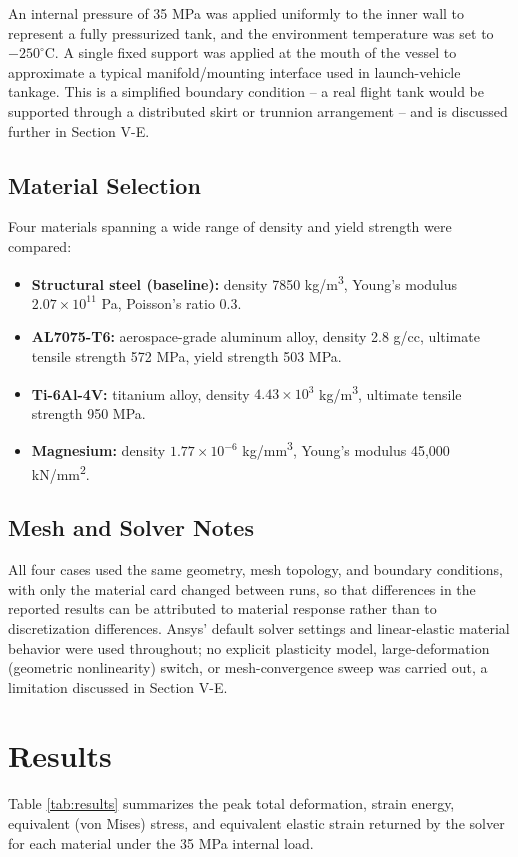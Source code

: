 \documentclass[conference]{IEEEtran}
\begin{document}
An internal pressure of 35 MPa was applied uniformly to the inner wall to represent a fully pressurized tank, and the environment temperature was set to $-250^{\circ}$C. A single fixed support was applied at the mouth of the vessel to approximate a typical manifold/mounting interface used in launch-vehicle tankage. This is a simplified boundary condition -- a real flight tank would be supported through a distributed skirt or trunnion arrangement -- and is discussed further in Section V-E.

\subsection{Material Selection}
Four materials spanning a wide range of density and yield strength were compared:
\begin{itemize}
    \item \textbf{Structural steel (baseline):} density 7850 kg/m\textsuperscript{3}, Young's modulus $2.07 \times 10^{11}$ Pa, Poisson's ratio 0.3.
    \item \textbf{AL7075-T6:} aerospace-grade aluminum alloy, density 2.8 g/cc, ultimate tensile strength 572 MPa, yield strength 503 MPa.
    \item \textbf{Ti-6Al-4V:} titanium alloy, density $4.43 \times 10^{3}$ kg/m\textsuperscript{3}, ultimate tensile strength 950 MPa.
    \item \textbf{Magnesium:} density $1.77 \times 10^{-6}$ kg/mm\textsuperscript{3}, Young's modulus 45{,}000 kN/mm\textsuperscript{2}.
\end{itemize}

\subsection{Mesh and Solver Notes}
All four cases used the same geometry, mesh topology, and boundary conditions, with only the material card changed between runs, so that differences in the reported results can be attributed to material response rather than to discretization differences. Ansys' default solver settings and linear-elastic material behavior were used throughout; no explicit plasticity model, large-deformation (geometric nonlinearity) switch, or mesh-convergence sweep was carried out, a limitation discussed in Section V-E.

\section{Results}
Table \ref{tab:results} summarizes the peak total deformation, strain energy, equivalent (von Mises) stress, and equivalent elastic strain returned by the solver for each material under the 35 MPa internal load.
\end{document}
